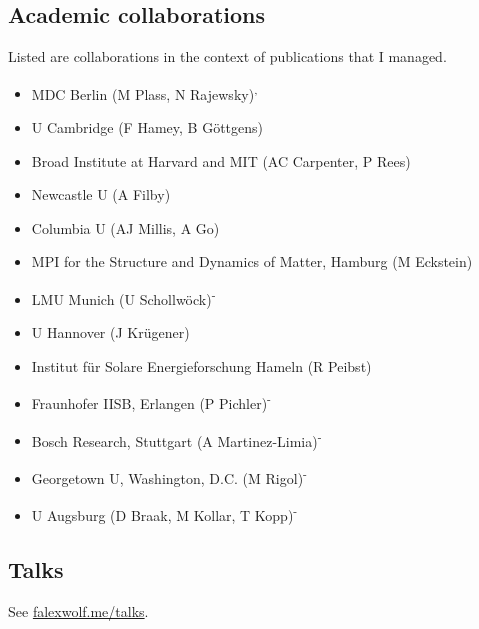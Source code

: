 \subsection*{Academic collaborations}
Listed are collaborations in the context of publications that I managed. 
\begin{itemize}
\item MDC Berlin (M Plass, N Rajewsky)\textsuperscript{,}
\item U Cambridge (F Hamey, B Göttgens)
\item Broad Institute at Harvard and MIT (AC Carpenter, P Rees)
\item Newcastle U (A Filby)
\item Columbia U (AJ Millis, A Go)
\item MPI for the Structure and Dynamics of Matter, Hamburg (M Eckstein)
\item LMU Munich (U Schollwöck)\textsuperscript{-}
\item U Hannover (J Krügener)
\item Institut für Solare Energieforschung Hameln (R Peibst)
\item Fraunhofer IISB, Erlangen (P Pichler)\textsuperscript{-}
\item Bosch Research, Stuttgart (A Martinez-Limia)\textsuperscript{-}
\item Georgetown U, Washington, D.C. (M Rigol)\textsuperscript{-}
\item U Augsburg (D Braak, M Kollar, T Kopp)\textsuperscript{-}
\end{itemize}


\subsection*{Talks}
See \href{http://falexwolf.me/talks/}{falexwolf.me/talks}.
